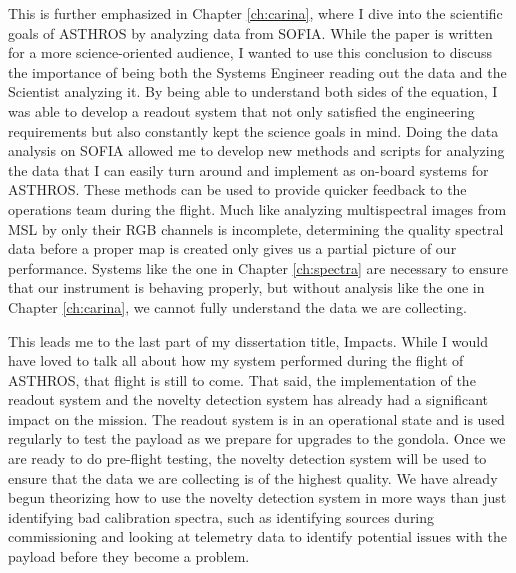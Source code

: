 This is further emphasized in Chapter \ref{ch:carina}, where I dive into the scientific goals of ASTHROS by analyzing data from SOFIA. 
While the paper is written for a more science-oriented audience, I wanted to use this conclusion to discuss the importance of being both the Systems Engineer reading out the data and the Scientist analyzing it.
By being able to understand both sides of the equation, I was able to develop a readout system that not only satisfied the engineering requirements but also constantly kept the science goals in mind.
Doing the data analysis on SOFIA allowed me to develop new methods and scripts for analyzing the data that I can easily turn around and implement as on-board systems for ASTHROS.
These methods can be used to provide quicker feedback to the operations team during the flight. 
Much like analyzing multispectral images from MSL by only their RGB channels is incomplete, determining the quality spectral data before a proper map is created only gives us a partial picture of our performance.
Systems like the one in Chapter \ref{ch:spectra} are necessary to ensure that our instrument is behaving properly, but without analysis like the one in Chapter \ref{ch:carina}, we cannot fully understand the data we are collecting.

This leads me to the last part of my dissertation title, Impacts.
While I would have loved to talk all about how my system performed during the flight of ASTHROS, that flight is still to come.
That said, the implementation of the readout system and the novelty detection system has already had a significant impact on the mission.
The readout system is in an operational state and is used regularly to test the payload as we prepare for upgrades to the gondola.
Once we are ready to do pre-flight testing, the novelty detection system will be used to ensure that the data we are collecting is of the highest quality.
We have already begun theorizing how to use the novelty detection system in more ways than just identifying bad calibration spectra, such as identifying sources during commissioning and looking at telemetry data to identify potential issues with the payload before they become a problem.

